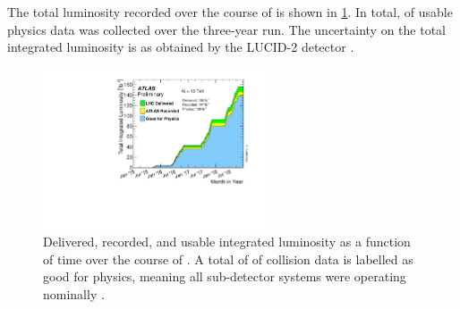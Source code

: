 The total luminosity recorded over the course of \runtwo is shown in \cref{fig:run2_lumi}. In total, \intlumi of usable physics data was collected over the three-year run.
The uncertainty on the total integrated luminosity is  \cite{ATLAS-CONF-2019-021} as obtained by the LUCID-2 detector \cite{Avoni:2633501}.
%
\begin{figure}[!htbp]
  \centering
  \includegraphics[width=0.6\textwidth]{chapters/2.detector/figs/intlumivstimeRun2DQall.pdf}
  \caption{
    Delivered, recorded, and usable integrated luminosity as a function of time over the course of \runtwo \cite{atlas-lumi-run2}.
    A total of \intlumi of collision data is labelled as good for physics, meaning all sub-detector systems were operating nominally \cite{DAPR-2018-01}.}
  \label{fig:run2_lumi}
\end{figure}
%


